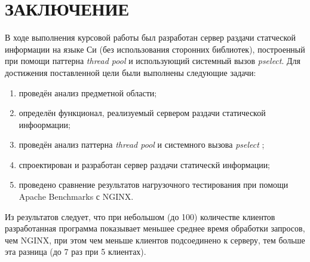 \section*{\large ЗАКЛЮЧЕНИЕ}

В  ходе  выполнения  курсовой работы  был разработан сервер раздачи статческой информации на языке Си (без использования сторонних библиотек), построенный при помощи паттерна \textit{thread pool} и использующий системный вызов \textit{pselect}. 
Для достижения поставленной цели были выполнены следующие задачи:
\begin{enumerate}[label=\arabic*)]
	\item проведён анализ предметной области;
	\item определён функционал, реализуемый сервером раздачи статической инфоормации;
	\item проведён анализ паттерна \textit{thread pool} и системного вызова \textit{pselect} ;
	\item спроектирован и разработан сервер раздачи статическй информации;
	\item проведено сравнение результатов нагрузочного тестирования при помощи Apache Benchmarks с NGINX.
\end{enumerate}

Из результатов следует, что при небольшом (до 100) количестве клиентов разработанная программа показывает меньшее среднее время обработки запросов, чем NGINX, при этом чем меньше клиентов подсоединено к серверу, тем больше эта разница (до 7 раз при 5 клиентах).
\pagebreak